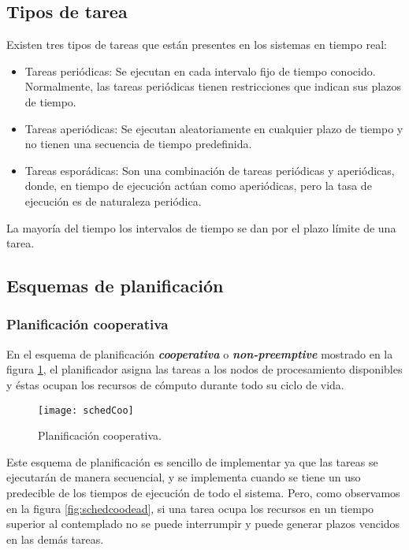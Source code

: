 \subsection{Tipos de tarea}

Existen tres tipos de tareas que están presentes en los sistemas en tiempo real:

\begin{itemize}
\item Tareas periódicas: Se ejecutan en cada intervalo fijo de tiempo conocido. Normalmente, las tareas periódicas tienen restricciones que indican sus plazos de tiempo.
\item Tareas aperiódicas: Se ejecutan aleatoriamente en cualquier plazo de tiempo y no tienen una secuencia de tiempo predefinida.
\item Tareas esporádicas: Son una combinación de tareas periódicas y aperiódicas, donde, en tiempo de ejecución actúan como aperiódicas, pero la tasa de ejecución es de naturaleza periódica.
\end{itemize}   

La mayoría del tiempo los intervalos de tiempo se dan por el plazo límite de una tarea.

    \subsection{Esquemas de planificación}
    
        \subsubsection{Planificación cooperativa}

En el esquema de planificación \textit{\textbf{cooperativa}} o \textit{\textbf{non-preemptive}} mostrado en la figura \ref{fig:schedcoo}, el planificador asigna las tareas a los nodos de procesamiento disponibles y éstas ocupan los recursos de cómputo durante todo su ciclo de vida.

  \begin{figure}[ht]
      \centering
        \texttt{[image: schedCoo]}
        \caption{Planificación cooperativa.\cite{medium}}
        \label{fig:schedcoo}
    \end{figure}
    
Este esquema de planificación es sencillo de implementar ya que las tareas se ejecutarán de manera secuencial, y se implementa cuando se tiene un uso predecible de los tiempos de ejecución de todo el sistema. Pero, como observamos en la figura \ref{fig:schedcoodead}, si una tarea ocupa los recursos en un tiempo superior al contemplado no se puede interrumpir y puede generar plazos vencidos en las demás tareas.

